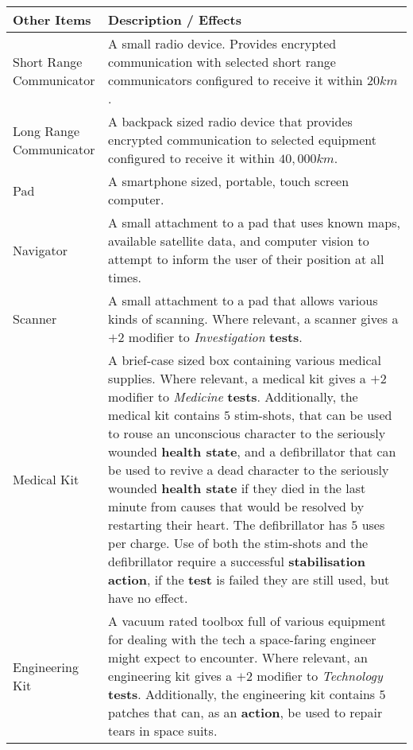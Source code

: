 \documentclass[11pt]{article}
\begin{document}
\begin{multicols}{3}
  \begin{tabularx}{\linewidth}{lX}
    Other Items & Description / Effects \\
    \hline
    \makecell[t]{Short Range\\Communicator} & A small radio device. Provides
      encrypted communication with selected short range communicators configured
      to receive it within $20km$. \\
    \makecell[t]{Long Range\\Communicator} & A backpack sized radio device that
      provides encrypted communication to selected equipment configured to
      receive it within $40,000km$. \\
    Pad & A smartphone sized, portable, touch screen computer. \\
    Navigator & A small attachment to a pad that uses known maps, available 
      satellite data, and computer vision to attempt to inform the user of their
      position at all times. \\
    Scanner & A small attachment to a pad that allows various kinds of scanning.
      Where relevant, a scanner gives a $+2$ modifier to \textit{Investigation}
      \textbf{tests}. \\
    Medical Kit & A brief-case sized box containing various medical supplies.
      Where relevant, a medical kit gives a $+2$ modifier to \textit{Medicine}
      \textbf{tests}. Additionally, the medical kit contains $5$ stim-shots,
      that can be used to rouse an unconscious character to the seriously
      wounded \textbf{health state}, and a defibrillator that can be used to
      revive a dead character to the seriously wounded \textbf{health state} if
      they died in the last minute from causes that would be resolved by
      restarting their heart. The defibrillator has $5$ uses per charge. Use of
      both the stim-shots and the defibrillator require a successful
      \textbf{stabilisation} \textbf{action}, if the \textbf{test} is failed
      they are still used, but have no effect. \\
    Engineering Kit & A vacuum rated toolbox full of various equipment for
      dealing with the tech a space-faring engineer might expect to encounter.
      Where relevant, an engineering kit gives a $+2$ modifier to
      \textit{Technology} \textbf{tests}. Additionally, the engineering kit
      contains $5$ patches that can, as an \textbf{action}, be used to repair
      tears in space suits.
  \end{tabularx}


\end{multicols}
\end{document}
